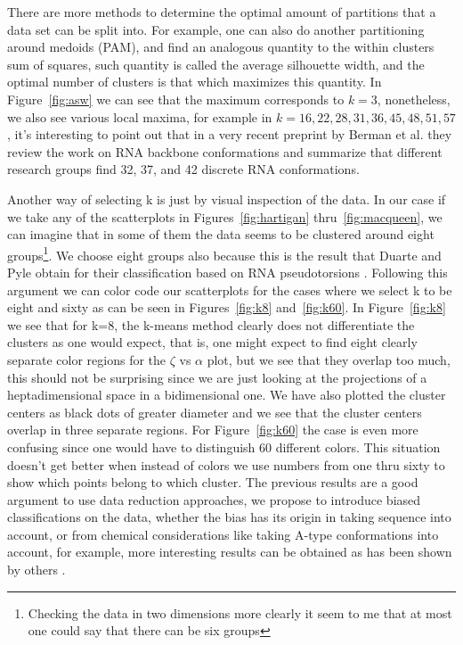 There are more  methods to determine the optimal  amount of partitions
that a data set can be split into. For example, one can also do another
partitioning around  medoids (PAM), and  find an analogous quantity
to the within  clusters sum of
squares, such quantity is called the average silhouette width, and the
optimal number of  clusters is that which maximizes  this quantity. In
Figure~\ref{fig:asw} we can see that the maximum corresponds to $k=3$,
nonetheless, we also see various local maxima, for example in $k=16,
22, 28, 31, 36, 45, 48, 51, 57$, it's interesting to point out that in
a very recent preprint by  Berman et al. \cite{richardson2008} they review
the work on RNA backbone  conformations and summarize that different 
research groups find 32, 37, and 42 discrete RNA conformations.

Another way of  selecting k is just by visual  inspection of the data.
In   our   case   if   we    take   any   of   the   scatterplots   in
Figures~\ref{fig:hartigan}  thru~\ref{fig:macqueen},  we  can  imagine
that  in some  of them  the data  seems to  be clustered  around eight
groups\footnote{Checking the  data in  two dimensions more  clearly it
seem to me that  at most one could say that there  can be six groups}.
We choose eight groups also because this is the result that Duarte and
Pyle  obtain  for their  classification  based  on RNA  pseudotorsions
\cite{duarte1998}.
Following this  argument we  can color code  our scatterplots  for the
cases  where we  select k  to be  eight and  sixty as  can be  seen in
Figures~\ref{fig:k8} and~\ref{fig:k60}.  In Figure~\ref{fig:k8} we see
that for  k=8, the  k-means method clearly  does not  differentiate the
clusters as one would expect, that  is, one might expect to find eight
clearly separate color  regions for the $\zeta$ vs  $\alpha$ plot, but
we see that they overlap too much, this should not be surprising since
we are just looking at  the projections of a heptadimensional space in
a bidimensional one. We have also plotted the cluster centers as black
dots of greater  diameter and we see that  the cluster centers overlap
in three  separate regions. For Figure~\ref{fig:k60} the  case is even
more  confusing  since one  would  have  to  distinguish 60  different
colors. This  situation doesn't get  better when instead of  colors we
use numbers from  one thru sixty to show which  points belong to which
cluster.  The  previous  results  are  a good  argument  to  use  data
reduction approaches,  we propose to  introduce biased classifications
on the data,  whether the bias has its origin  in taking sequence into
account,   or  from   chemical  considerations   like   taking  A-type
conformations into account, for  example, more interesting results can
be  obtained as has  been shown  by others  \cite{hershkovitz2006}. 

